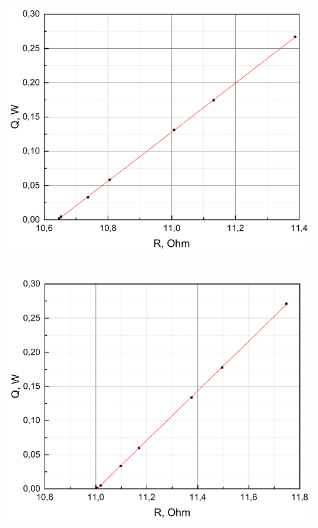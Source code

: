 \documentclass[a4paper,12pt]{article} %
\begin{document}
\begin{enumerate}
\begin{figure}[h!]
\begin{floatrow}
         {\includegraphics[width=8cm,height=7cm]{Graph_3}}
         {\includegraphics[width=8cm,height=7cm]{Graph_4}}         
\end{floatrow}
\end{figure}


\end{enumerate}
\end{document}
